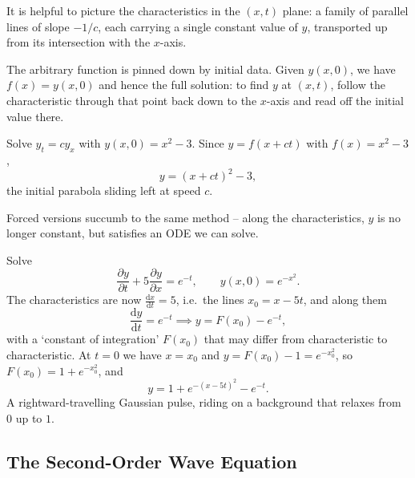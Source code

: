 It is helpful to picture the characteristics in the $(x, t)$ plane: a family of parallel lines of slope $-1/c$, each carrying a single constant value of $y$, transported up from its intersection with the $x$-axis.

\begin{center}
\end{center}

The arbitrary function is pinned down by initial data. Given $y(x, 0)$, we have $f(x) = y(x, 0)$ and hence the full solution: to find $y$ at $(x, t)$, follow the characteristic through that point back down to the $x$-axis and read off the initial value there.

\begin{example}
	Solve $y_t = c y_x$ with $y(x, 0) = x^2 - 3$. Since $y = f(x + ct)$ with $f(x) = x^2 - 3$,
	$$
	y = (x + ct)^2 - 3,
	$$
	the initial parabola sliding left at speed $c$.
\end{example}

Forced versions succumb to the same method -- along the characteristics, $y$ is no longer constant, but satisfies an ODE we can solve.

\begin{example}
	Solve
	$$
	\frac{\partial y}{\partial t} + 5 \frac{\partial y}{\partial x} = e^{-t}, \qquad y(x, 0) = e^{-x^2}.
	$$
	The characteristics are now $\frac{\mathrm{d}x}{\mathrm{d}t} = 5$, i.e.\ the lines $x_0 = x - 5t$, and along them
	$$
	\frac{\mathrm{d}y}{\mathrm{d}t} = e^{-t} \implies y = F(x_0) - e^{-t},
	$$
	with a `constant of integration' $F(x_0)$ that may differ from characteristic to characteristic. At $t = 0$ we have $x = x_0$ and $y = F(x_0) - 1 = e^{-x_0^2}$, so $F(x_0) = 1 + e^{-x_0^2}$, and
	$$
	y = 1 + e^{-(x - 5t)^2} - e^{-t}.
	$$
	A rightward-travelling Gaussian pulse, riding on a background that relaxes from $0$ up to $1$.
\end{example}

\subsection{The Second-Order Wave Equation}

